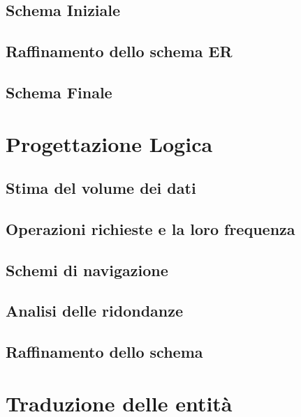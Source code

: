 \documentclass{article}
\begin{document}
\subsection{Schema Iniziale}


\subsection{Raffinamento dello schema ER}


\subsection{Schema Finale}



\section{Progettazione Logica}

\subsection{Stima del volume dei dati}


\subsection{Operazioni richieste e la loro frequenza}


\subsection{Schemi di navigazione}


\subsection{Analisi delle ridondanze}


\subsection{Raffinamento dello schema} %


\section{Traduzione delle entità}

\end{document}
